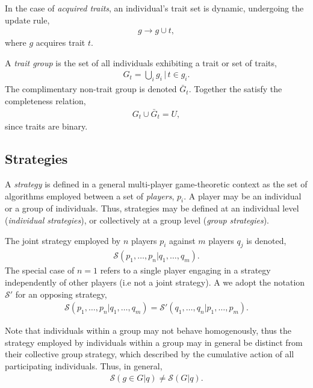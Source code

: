 \documentclass[aps,rmp,twocolumn,amsmath,amssymb,nofootinbib,superscriptaddress]{revtex4}
\begin{document}
In the case of \textit{acquired traits}, an individual's trait set is dynamic, undergoing the update rule,
\begin{align}
	g\to g\cup t,	
\end{align}
where $g$ acquires trait $t$.

A \textit{trait group} is the set of all individuals exhibiting a trait or set of traits,
\begin{align}
	G_t = \bigcup_i g_i \,|\, t\in g_i.
\end{align}
The complimentary non-trait group is denoted $\bar G_t$. Together the satisfy the completeness relation,
\begin{align}
G_t \cup \bar G_t = U,	
\end{align}
since traits are binary.

\subsection{Strategies}

A \textit{strategy} is defined in a general multi-player game-theoretic context as the set of algorithms employed between a set of \textit{players}, $p_i$. A player may be an individual or a group of individuals. Thus, strategies may be defined at an individual level (\textit{individual strategies}), or collectively at a group level (\textit{group strategies}).

The joint strategy employed by $n$ players $p_i$ against $m$ players $q_j$ is denoted,
\begin{align}
	\mathcal{S}(p_1,\dots,p_n|q_1,\dots,q_m).
\end{align}
The special case of $n=1$ refers to a single player engaging in a strategy independently of other players (i.e not a joint strategy). A we adopt the notation $\mathcal{S}'$ for an opposing strategy,
\begin{align}
	\mathcal{S}(p_1,\dots,p_n|q_1,\dots,q_m) = \mathcal{S}'(q_1,\dots,q_n|p_1,\dots,p_m).
\end{align}

Note that individuals within a group may not behave homogenously, thus the strategy employed by individuals within a group may in general be distinct from their collective group strategy, which described by the cumulative action of all participating individuals. Thus, in general,
\begin{align}
	\mathcal{S}(g\in G|q)\neq \mathcal{S}(G|q).
\end{align}
\end{document}
